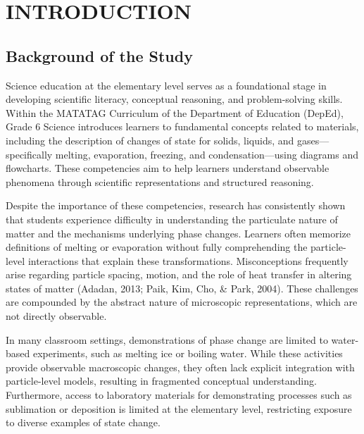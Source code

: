 \chapter{INTRODUCTION}

\section{Background of the Study}

Science education at the elementary level serves as a foundational stage in developing scientific literacy, conceptual reasoning, and problem-solving skills. Within the MATATAG Curriculum of the Department of Education (DepEd), Grade 6 Science introduces learners to fundamental concepts related to materials, including the description of changes of state for solids, liquids, and gases---specifically melting, evaporation, freezing, and condensation---using diagrams and flowcharts. These competencies aim to help learners understand observable phenomena through scientific representations and structured reasoning.

Despite the importance of these competencies, research has consistently shown that students experience difficulty in understanding the particulate nature of matter and the mechanisms underlying phase changes. Learners often memorize definitions of melting or evaporation without fully comprehending the particle-level interactions that explain these transformations. Misconceptions frequently arise regarding particle spacing, motion, and the role of heat transfer in altering states of matter (Adadan, 2013; Paik, Kim, Cho, \& Park, 2004). These challenges are compounded by the abstract nature of microscopic representations, which are not directly observable.

In many classroom settings, demonstrations of phase change are limited to water-based experiments, such as melting ice or boiling water. While these activities provide observable macroscopic changes, they often lack explicit integration with particle-level models, resulting in fragmented conceptual understanding. Furthermore, access to laboratory materials for demonstrating processes such as sublimation or deposition is limited at the elementary level, restricting exposure to diverse examples of state change.

